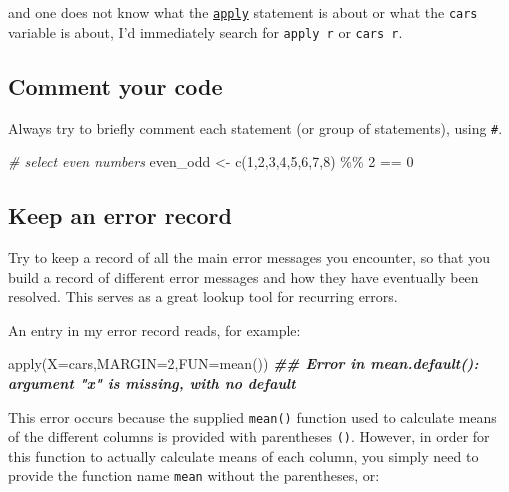 \documentclass[
]{book}
\newenvironment{Shaded}{\begin{snugshade}}{\end{snugshade}}
\newcommand{\AttributeTok}[1]{\textcolor[rgb]{0.77,0.63,0.00}{#1}}
\newcommand{\CommentTok}[1]{\textcolor[rgb]{0.56,0.35,0.01}{\textit{#1}}}
\newcommand{\DecValTok}[1]{\textcolor[rgb]{0.00,0.00,0.81}{#1}}
\newcommand{\DocumentationTok}[1]{\textcolor[rgb]{0.56,0.35,0.01}{\textbf{\textit{#1}}}}
\newcommand{\FunctionTok}[1]{\textcolor[rgb]{0.00,0.00,0.00}{#1}}
\newcommand{\NormalTok}[1]{#1}
\newcommand{\OtherTok}[1]{\textcolor[rgb]{0.56,0.35,0.01}{#1}}
\newcommand{\SpecialCharTok}[1]{\textcolor[rgb]{0.00,0.00,0.00}{#1}}
\begin{document}
and one does not know what the \href{https://stat.ethz.ch/R-manual/R-devel/library/base/html/apply.html}{\texttt{apply}} statement is about or what the \texttt{cars} variable is about, I'd immediately search for \texttt{apply\ r} or \texttt{cars\ r}.

\hypertarget{comment-your-code}{%
\subsection{Comment your code}\label{comment-your-code}}

Always try to briefly comment each statement (or group of statements), using \texttt{\#}.

\begin{Shaded}
\begin{Highlighting}[]
\CommentTok{\# select even numbers}
\NormalTok{even\_odd }\OtherTok{\textless{}{-}} \FunctionTok{c}\NormalTok{(}\DecValTok{1}\NormalTok{,}\DecValTok{2}\NormalTok{,}\DecValTok{3}\NormalTok{,}\DecValTok{4}\NormalTok{,}\DecValTok{5}\NormalTok{,}\DecValTok{6}\NormalTok{,}\DecValTok{7}\NormalTok{,}\DecValTok{8}\NormalTok{) }\SpecialCharTok{\%\%} \DecValTok{2} \SpecialCharTok{==} \DecValTok{0}
\end{Highlighting}
\end{Shaded}

\hypertarget{keep-an-error-record}{%
\subsection{Keep an error record}\label{keep-an-error-record}}

Try to keep a record of all the main error messages you encounter, so that you build a record of different error messages and how they have eventually been resolved. This serves as a great lookup tool for recurring errors.

An entry in my error record reads, for example:

\begin{Shaded}
\begin{Highlighting}[]
\FunctionTok{apply}\NormalTok{(}\AttributeTok{X=}\NormalTok{cars,}\AttributeTok{MARGIN=}\DecValTok{2}\NormalTok{,}\AttributeTok{FUN=}\FunctionTok{mean}\NormalTok{())}
\DocumentationTok{\#\# Error in mean.default(): argument "x" is missing, with no default}
\end{Highlighting}
\end{Shaded}

This error occurs because the supplied \texttt{mean()} function used to calculate means of the different columns is provided with parentheses \texttt{()}. However, in order for this function to actually calculate means of each column, you simply need to provide the function name \texttt{mean} without the parentheses, or:
\end{document}
